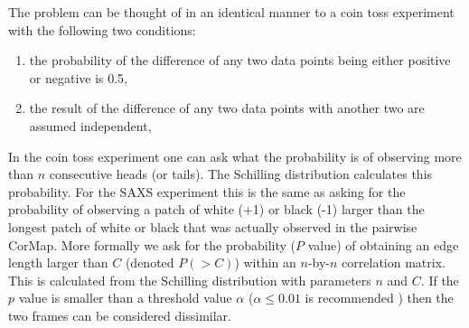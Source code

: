 The problem can be thought of in an identical manner to a coin toss experiment with the following two conditions:
\begin{enumerate}
    \item the probability of the difference of any two data points being either positive or negative is 0.5,
    \item the result of the difference of any two data points with another two are assumed independent,
\end{enumerate}
In the coin toss experiment one can ask what the probability is of observing more than $n$ consecutive heads (or tails).
The Schilling distribution \cite{schilling1990longest} calculates this probability.
For the SAXS experiment this is the same as asking for the probability of observing a patch of white (+1) or black (-1) larger than the longest patch of white or black that was actually observed in the pairwise CorMap.
More formally we ask for the probability ($P$ value) of obtaining an edge length larger than $C$ (denoted $P(>C)$) within an $n$-by-$n$ correlation matrix.
This is calculated from the Schilling distribution with parameters $n$ and $C$.
If the $p$ value is smaller than a threshold value $\alpha$ ($\alpha \le 0.01$ is recommended \cite{franke2015correlation}) then the two frames can be considered dissimilar.

